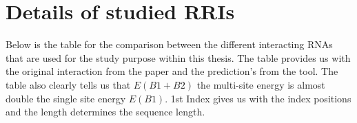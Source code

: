 \documentclass[twoside,a4paper]{report}
\begin{document}
\clearpage	


\section{Details of studied RRIs}

Below is the table for the comparison between the different interacting RNAs that are used for the study purpose within this thesis. The table provides us with the original interaction from the paper and the prediction's from the tool. The table also clearly tells us that $E(B1+ B2)$ the multi-site energy is almost double the single site energy $E(B1)$. 1st Index gives us with the index positions and the length determines the sequence length.\\
	
\end{document}
